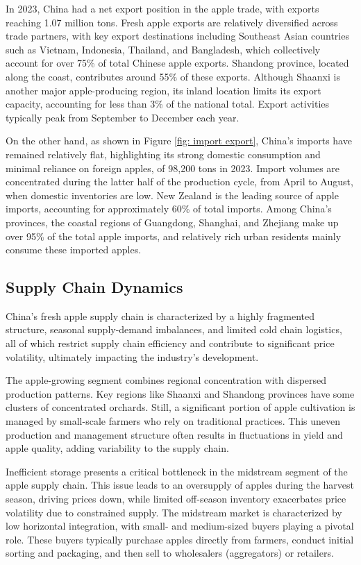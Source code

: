 In 2023, China had a net export position in the apple trade, with exports reaching 1.07 million tons. Fresh apple exports are relatively diversified across trade partners, with key export destinations including Southeast Asian countries such as Vietnam, Indonesia, Thailand, and Bangladesh, which collectively account for over 75\% of total Chinese apple exports. Shandong province, located along the coast, contributes around 55\% of these exports. Although Shaanxi is another major apple-producing region, its inland location limits its export capacity, accounting for less than 3\% of the national total. Export activities typically peak from September to December each year.

On the other hand, as shown in Figure \ref{fig: import export}, China’s imports have remained relatively flat, highlighting its strong domestic consumption and minimal reliance on foreign apples, of 98,200 tons in 2023.  Import volumes are concentrated during the latter half of the production cycle, from April to August, when domestic inventories are low. New Zealand is the leading source of apple imports, accounting for approximately 60\% of total imports. Among China's provinces, the coastal regions of Guangdong, Shanghai, and Zhejiang make up over 95\% of the total apple imports, and relatively rich urban residents mainly consume these imported apples.





    
\subsection{Supply Chain Dynamics}
China’s fresh apple supply chain is characterized by a highly fragmented structure, seasonal supply-demand imbalances, and limited cold chain logistics, all of which restrict supply chain efficiency and contribute to significant price volatility, ultimately impacting the industry’s development.

The apple-growing segment combines regional concentration with dispersed production patterns. Key regions like Shaanxi and Shandong provinces have some clusters of concentrated orchards. Still, a significant portion of apple cultivation is managed by small-scale farmers who rely on traditional practices. This uneven production and management structure often results in fluctuations in yield and apple quality, adding variability to the supply chain.

Inefficient storage presents a critical bottleneck in the midstream segment of the apple supply chain. This issue leads to an oversupply of apples during the harvest season, driving prices down, while limited off-season inventory exacerbates price volatility due to constrained supply. The midstream market is characterized by low horizontal integration, with small- and medium-sized buyers playing a pivotal role. These buyers typically purchase apples directly from farmers, conduct initial sorting and packaging, and then sell to wholesalers (aggregators) or retailers. 

